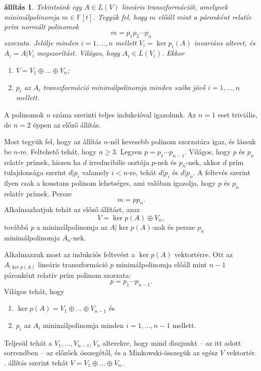 \documentclass[a4paper, showtrims]{memoir}
\makeatletter
\renewenvironment{proof}[1][\proofname]
    {\par\pushQED{\qed}%
    \normalfont \topsep6\p@\@plus6\p@\relax
    \trivlist
    \item[\hskip\labelsep
        \itshape
    #1\@addpunct{:}]\ignorespaces}
    {\popQED\endtrivlist\@endpefalse}
\theoremstyle{plain}
\newtheorem{proposition}{állítás}[chapter]
\theoremstyle{remark}
\theoremstyle{definition}
\makeatother
\begin{document}
\begin{proposition}\label{pr:redukcio-primszorzat}
	Tekintsünk egy $A\in L\left( V \right)$ lineáris transzformációt,
	amelynek minimálpolinomja $m\in\mathbb{F}\left[ t \right]$.
	Tegyük fel, hogy $m$ előáll mint a páronként relatív prím
	normált polinomok
	\[
		m=p_1p_2\cdots p_n
	\]
	szorzata.
	Jelölje minden $i=1,\ldots,n$ mellett $V_i=\ker p_i\left( A \right)$
	invariáns alteret, és $A_i=A|V_i$ megszorítást.
	Világos, hogy $A_i\in L\left( V_i \right)$.
	Ekkor
	\begin{enumerate}
		\item $V=V_1\oplus\dots\oplus V_n$;
		\item $p_i$ az $A_i$ transzformáció minimálpolinomja minden szóba jövő
		      $i=1,\ldots,n$ mellett.\qedhere
	\end{enumerate}
\end{proposition}
\begin{proof}
	A polinomok $n$ száma szerinti teljes indukcióval igazolunk.
	Az $n=1$ eset triviális, de $n=2$ éppen az előző állítás.

	Most tegyük fel, hogy az állítás $n$-nél kevesebb polinom szorzatára igaz,
	és lássuk be $n$-re.
	Feltehető tehát, hogy $n\geq 3$.
	Legyen $p=p_1\cdots p_{n-1}$.
	Világos, hogy $p$ és $p_n$ relatív prímek, hiszen ha $d$ irreducibilis osztója
	$p$-nek és $p_n$-nek,
	akkor $d$ prím tulajdonsága szerint $d|p_i$ valamely $i<n$-re,
	tehát $d|p_i$ és $d|p_n$.
	A feltevés szerint ilyen csak a konstans polinom lehetséges,
	ami valóban igazolja, hogy $p$ és $p_n$ relatív prímek.
	Persze
	\[
		m=pp_n.
	\]
	Alkalmazhatjuk tehát az előző állítást, azaz
	\[
		V=\ker p\left( A \right)\oplus V_n,
	\]
	továbbá $p$ a minimálpolinomja az $A|\ker p\left( A \right)$-nak
	és persze $p_n$ minimálpolinomja $A_n$-nek.

	Alkalmazzuk most az indukciós feltevést a $\ker p\left( A \right)$ vektortérre.
	Ott az $A_{|\ker p\left( A \right)}$ lineáris transzformáció $p$ minimálpolinomja
	előáll mint $n-1$ páronként relatív prím polinom szorzata:
	\[
		p=p_1\cdots p_{n-1}.
	\]
	Világos tehát, hogy
	\begin{enumerate}
		\item
		      $\ker p\left( A \right)=V_1\oplus\dots\oplus V_{n-1}$ és
		\item $p_i$ az $A_i$ minimálpolinomja minden $i=1,\ldots,n-1$ mellett.
	\end{enumerate}
	Teljesül tehát a $V_1,\ldots,V_{n-1},V_n$ alterekre,
	hogy mind diszjunkt -- az itt adott sorrendben -- az előzőek összegétől,
	és a Minkowski-összegük az egész $V$ vektortér.
    . állítás szerint tehát $V=V_1\oplus\dots\oplus V_n$.
\end{proof}
\end{document}
